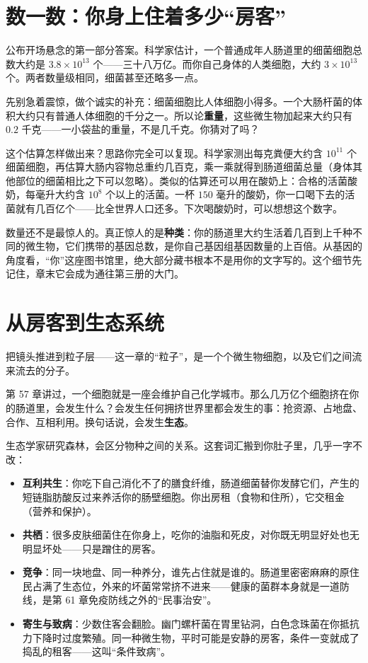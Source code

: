 \section{数一数：你身上住着多少“房客”}

公布开场悬念的第一部分答案。科学家估计，一个普通成年人肠道里的细菌细胞总数大约是 $3.8\times 10^{13}$ 个——三十八万亿。而你自己身体的人类细胞，大约 $3\times 10^{13}$ 个。两者数量级相同，细菌甚至还略多一点。

先别急着震惊，做个诚实的补充：细菌细胞比人体细胞小得多。一个大肠杆菌的体积大约只有普通人体细胞的千分之一。所以论\textbf{重量}，这些微生物加起来大约只有 $0.2$ 千克——一小袋盐的重量，不是几千克。你猜对了吗？

\begin{qiaoliang}
这个估算怎样做出来？思路你完全可以复现。科学家测出每克粪便大约含 $10^{11}$ 个细菌细胞，再估算大肠内容物总重约几百克，乘一乘就得到肠道细菌总量（身体其他部位的细菌相比之下可以忽略）。类似的估算还可以用在酸奶上：合格的活菌酸奶，每毫升大约含 $10^{8}$ 个以上的活菌。一杯 $150$ 毫升的酸奶，你一口喝下去的活菌就有几百亿个——比全世界人口还多。下次喝酸奶时，可以想想这个数字。
\end{qiaoliang}

数量还不是最惊人的。真正惊人的是\textbf{种类}：你的肠道里大约生活着几百到上千种不同的微生物，它们携带的基因总数，是你自己基因组基因数量的上百倍。从基因的角度看，“你”这座图书馆里，绝大部分藏书根本不是用你的文字写的。这个细节先记住，章末它会成为通往第三册的大门。

\section{从房客到生态系统}

把镜头推进到粒子层——这一章的“粒子”，是一个个微生物细胞，以及它们之间流来流去的分子。

第 57 章讲过，一个细胞就是一座会维护自己化学城市。那么几万亿个细胞挤在你的肠道里，会发生什么？会发生任何拥挤世界里都会发生的事：抢资源、占地盘、合作、互相利用。换句话说，会发生\textbf{生态}。

生态学家研究森林，会区分物种之间的关系。这套词汇搬到你肚子里，几乎一字不改：

\begin{itemize}[itemsep=2pt]
\item \textbf{互利共生}：你吃下自己消化不了的膳食纤维，肠道细菌替你发酵它们，产生的短链脂肪酸反过来养活你的肠壁细胞。你出房租（食物和住所），它交租金（营养和保护）。
\item \textbf{共栖}：很多皮肤细菌住在你身上，吃你的油脂和死皮，对你既无明显好处也无明显坏处——只是蹭住的房客。
\item \textbf{竞争}：同一块地盘、同一种养分，谁先占住就是谁的。肠道里密密麻麻的原住民占满了生态位，外来的坏菌常常挤不进来——健康的菌群本身就是一道防线，是第 61 章免疫防线之外的“民事治安”。
\item \textbf{寄生与致病}：少数住客会翻脸。幽门螺杆菌在胃里钻洞，白色念珠菌在你抵抗力下降时过度繁殖。同一种微生物，平时可能是安静的房客，条件一变就成了捣乱的租客——这叫“条件致病”。
\end{itemize}

